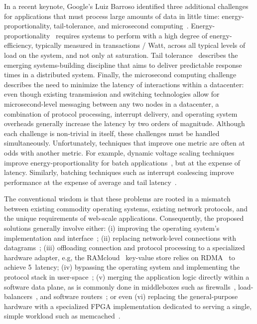 In a recent keynote, Google's Luiz Barroso identified three additional challenges
for applications that must process large amounts of data in little
time: energy-proportionality, tail-tolerance, and microsecond
computing~\cite{luiz-isscc}.
Energy-proportionality~\cite{DBLP:journals/computer/BarrosoH07}
requires systems to perform with a high degree of energy-efficiency,
typically measured in transactions / Watt, across all typical levels
of load on the system, and not only at saturation. Tail
tolerance~\cite{DBLP:journals/cacm/DeanB13} describes the emerging
systems-building discipline that aims to deliver predictable response
times in a distributed system.  Finally, the microsecond computing
challenge describes the need to minimize the latency of interactions
within a datacenter: even though existing transmission and switching
technologies allow for microsecond-level messaging between any two
nodes in a datacenter, a combination of protocol processing, interrupt
delivery, and operating system overheads generally increase the
latency by two orders of magnitude.  Although each challenge is
non-trivial in itself, these challenges must be handled
simultaneously.  Unfortunately, techniques that improve one metric are
often at odds with another metric.  For example, dynamic voltage
scaling techniques improve energy-proportionality for batch
applications~\cite{DBLP:conf/asplos/DelimitrouK14}, but at the
expense of latency.  Similarly, batching techniques such as interrupt
coalescing improve performance at the expense of average and tail
latency~\cite{missing}.

The conventional wisdom is that these problems are rooted in a
mismatch between existing commodity operating systems, existing
network protocols, and the unique requirements of web-scale
applications.  Consequently, the proposed solutions generally involve
either: 
(i) improving the operating system's implementation and
interface~\cite{DBLP:conf/eurosys/PesterevSZM12,han2012megapipe}; 
(ii) replacing network-level connections with
datagrams~\cite{nishtala2013scaling}; 
(iii) offloading connection and protocol processing to a specialized hardware adapter, e.g, the
RAMcloud~\cite{DBLP:conf/sosp/OngaroRSOR11} key-value store relies on
RDMA~\cite{rdma-user-manual} to achieve 5~\microsecond latency; (iv)
bypassing the operating system and implementing the protocol stack in
user-space~\cite{jeong2014mtcp}; (v) merging the application logic
directly within a software data plane, as is commonly done in
middleboxes such as firewalls~\cite{missing},
load-balancers~\cite{missing}, and software
routers~\cite{DBLP:journals/tocs/KohlerMCJK00,DBLP:conf/sosp/DobrescuEACFIKMR09};
or even (vi) replacing the general-purpose hardware with a specialized
FPGA implementation dedicated to serving a single, simple workload
such as memcached~\cite{DBLP:conf/fpga/ChalamalasettiLWARM13}.

